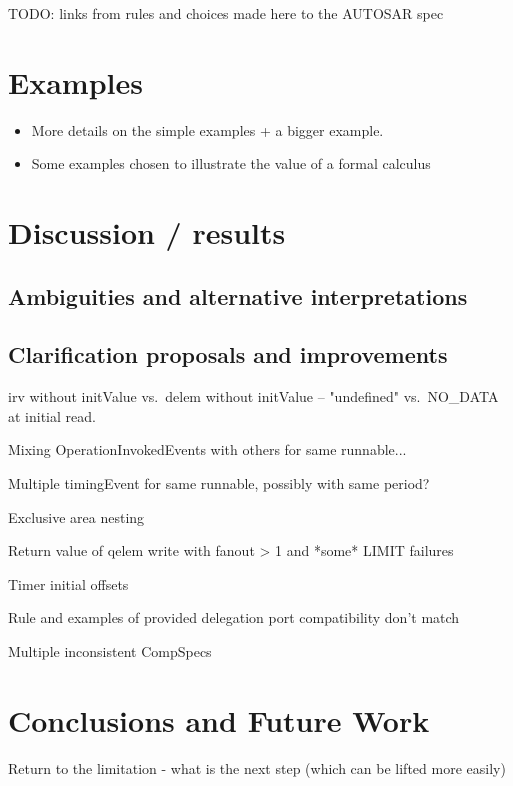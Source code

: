 \documentclass[twocolumn]{article}
\begin{document}
TODO: links from rules and choices made here to the AUTOSAR spec

\section{Examples}
\label{sec:Examples}

\begin{itemize}
\item More details on the simple examples + a bigger example.
\item Some examples chosen to illustrate the value of a formal calculus
\end{itemize}

\section{Discussion / results}
\label{sec:Disc}

\subsection{Ambiguities and alternative interpretations}
\label{sec:DiscAmb}

\subsection{Clarification proposals and improvements}
\label{sec:DiscImp}

irv without initValue vs.\ delem without initValue -- "undefined" vs.\ NO\_DATA at initial read.

Mixing OperationInvokedEvents with others for same runnable...

Multiple timingEvent for same runnable, possibly with same period?

Exclusive area nesting

Return value of qelem write with fanout > 1 and *some* LIMIT failures

Timer initial offsets

Rule and examples of provided delegation port compatibility don't match

Multiple inconsistent CompSpecs


\section{Conclusions and Future Work}
\label{sec:Conc}

Return to the limitation - what is the next step (which can be lifted more easily)
\end{document}
